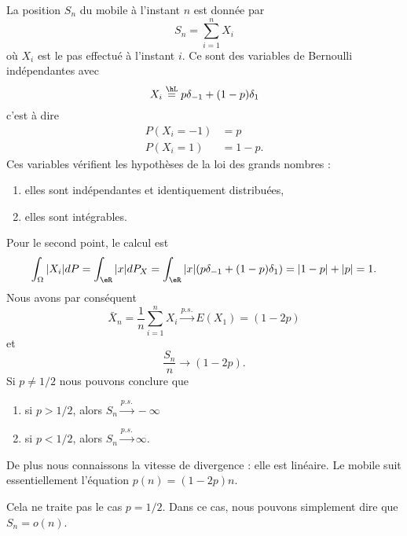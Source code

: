 La position \( S_n\) du mobile à l'instant \( n\) est donnée par
\begin{equation}
    S_n=\sum_{i=1}^nX_i
\end{equation}
où \( X_i\) est le pas effectué à l'instant \( i\). Ce sont des variables de Bernoulli indépendantes avec
\begin{equation}
    X_i\stackrel{\hL}{=}p\delta_{-1}+(1-p)\delta_1
\end{equation}
c'est à dire
\begin{subequations}
    \begin{align}
        P(X_i=-1)&=p\\
        P(X_i=1)&=1-p.
    \end{align}
\end{subequations}
Ces variables vérifient les hypothèses de la loi des grands nombres :
\begin{enumerate}
    \item
        elles sont indépendantes et identiquement distribuées,
    \item
        elles sont intégrables.
\end{enumerate}
Pour le second point, le calcul est
\begin{equation}
    \int_{\Omega}| X_i |dP=\int_{\eR}| x |dP_X=\int_{\eR}| x |(p\delta_{-1}+(1-p)\delta_{1})=| 1-p |+| p |=1.
\end{equation}
Nous avons par conséquent
\begin{equation}
    \bar X_n=\frac{1}{ n }\sum_{i=1}^nX_i\stackrel{p.s.}{\longrightarrow} E(X_1)=(1-2p)
\end{equation}
et
\begin{equation}
    \frac{ S_n }{ n }\to(1-2p).
\end{equation}
Si \( p\neq 1/2\) nous pouvons conclure que
\begin{enumerate}
    \item
        si \( p>1/2\), alors \( S_n\stackrel{p.s.}{\longrightarrow}-\infty\)
    \item
        si \( p<1/2\), alors \( S_n\stackrel{p.s.}{\longrightarrow}\infty\).
\end{enumerate}
De plus nous connaissons la vitesse de divergence : elle est linéaire. Le mobile suit essentiellement l'équation
\( p(n)=(1-2p)n\).

\begin{remark}
    Cela ne traite pas le cas \( p=1/2\). Dans ce cas, nous pouvons simplement dire que \( S_n=o(n)\).
\end{remark}

